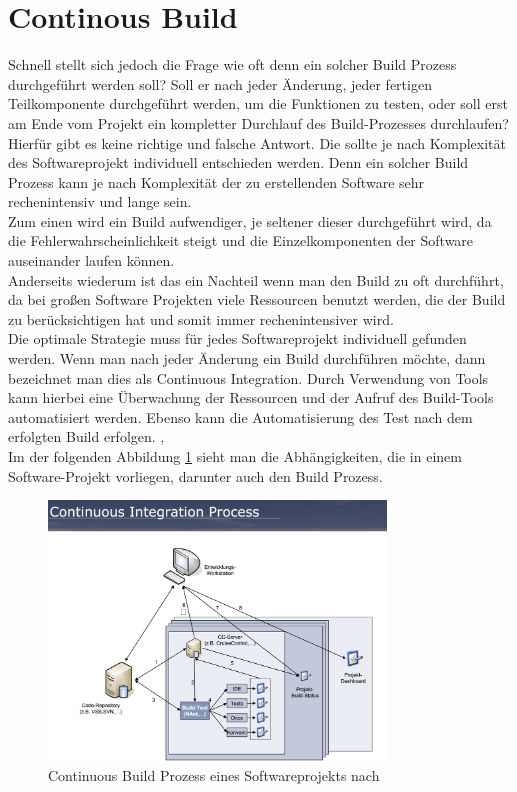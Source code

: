 \section{Continous Build}
Schnell stellt sich jedoch die Frage wie oft denn ein solcher Build Prozess durchgeführt werden soll? Soll er nach jeder Änderung, jeder fertigen Teilkomponente durchgeführt werden, um die Funktionen zu testen, oder soll erst am Ende vom Projekt ein kompletter Durchlauf des Build-Prozesses durchlaufen?
\\
Hierfür gibt es keine richtige und falsche Antwort. Die sollte je nach Komplexität des Softwareprojekt individuell entschieden werden. Denn ein solcher Build Prozess kann je nach Komplexität der zu erstellenden Software sehr rechenintensiv und lange sein. 
\\
Zum einen wird ein Build aufwendiger, je seltener dieser durchgeführt wird, da die Fehlerwahrscheinlichkeit steigt und die Einzelkomponenten der Software auseinander laufen können.
\\
Anderseits wiederum ist das ein Nachteil wenn man den Build zu oft durchführt, da bei großen Software Projekten viele Ressourcen benutzt werden, die der Build zu berücksichtigen hat und somit immer rechenintensiver wird.
\\
Die optimale Strategie muss für jedes Softwareprojekt individuell gefunden werden.
Wenn man nach jeder Änderung ein Build durchführen möchte, 
dann bezeichnet man dies als Continuous Integration.
Durch Verwendung von Tools kann hierbei eine Überwachung der Ressourcen und der Aufruf des Build-Tools automatisiert werden. Ebenso kann die Automatisierung des Test nach dem erfolgten Build erfolgen. \cite{build-seminar}, \cite{software-analysis}
\\
Im der folgenden Abbildung \ref{fig:ci} sieht man die Abhängigkeiten, die in einem Software-Projekt vorliegen, darunter auch den Build Prozess.

\begin{figure}[H]
	\includegraphics[width=0.8\textwidth]{img/continuousintegration.png}
	\caption{Continuous Build Prozess eines Softwareprojekts nach \cite{build-continuous}}
\label{fig:ci}
\end{figure}

